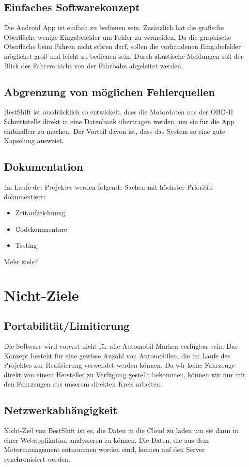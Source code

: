 \subsection{Einfaches Softwarekonzept}
Die Android App ist einfach zu bedienen sein. Zusätzlich hat die grafische Oberfläche wenige Eingabefelder um Fehler zu vermeiden.
Da die graphische Oberfläche beim Fahren nicht stören darf, sollen die vorhandenen Eingabefelder möglichst groß und leicht zu bedienen sein. Durch akustische Meldungen soll der Blick des Fahrers nicht von der Fahrbahn abgeleitet werden.

\subsection{Abgrenzung von möglichen Fehlerquellen}
BestShift ist ausdrücklich so entwickelt, dass die Motordaten aus der OBD-II Schnittstelle direkt in eine Datenbank übertragen werden, um sie für die App einbindbar zu machen. Der Vorteil davon ist, dass das System so eine gute Kapselung ausweist.

\subsection{Dokumentation}
Im Laufe des Projektes werden folgende Sachen mit höchster Priorität dokumentiert:
\begin{itemize}
\item Zeitaufzeichnung
\item Codekommentare
\item Testing
\end{itemize}


\todo Mehr ziele?


\section{Nicht-Ziele}

\subsection{Portabilität/Limitierung}
Die Software wird vorerst nicht für alle Automobil-Marken verfügbar sein. Das Konzept besteht für eine gewisse Anzahl von Automobilen, die im Laufe des Projektes zur Realisierung verwendet werden können. Da wir keine Fahrzeuge direkt von einem Hersteller zu Verfügung gestellt bekommen, können wir nur mit den Fahrzeugen aus unserem direkten Kreis arbeiten. 

\subsection{Netzwerkabhängigkeit}
Nicht-Ziel von BestShift ist es, die Daten in die Cloud zu laden um sie dann in einer Webapplikation analysieren zu können. Die Daten, die aus dem Motormanagement entnommen worden sind, können auf den Server synchronisiert  werden. 

